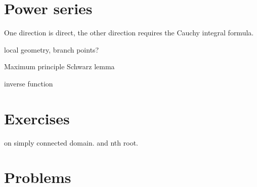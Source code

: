 \documentclass{../note}
\begin{document}
\section{Power series}
\begin{prb}
One direction is direct, the other direction requires the Cauchy integral formula.
\end{prb}

\begin{prb}
\end{prb}


local geometry, branch points?

\begin{prb}
\end{prb}
Maximum principle
Schwarz lemma

\begin{prb}
\end{prb}
inverse function



\section*{Exercises}
\begin{prb}
\end{prb}
\begin{prb}
on simply connected domain.
and nth root.
\end{prb}
\begin{prb}
\end{prb}


\section*{Problems}
\end{document}
